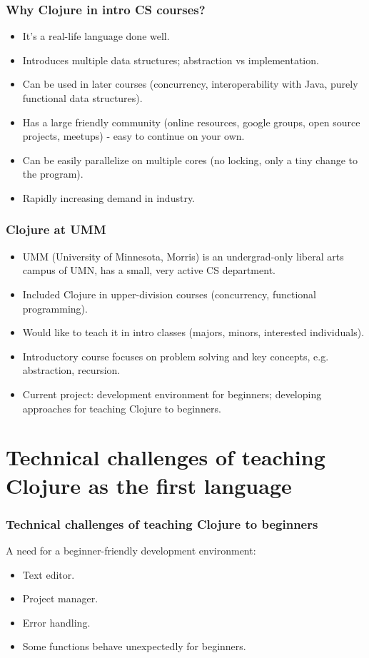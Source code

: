 \documentclass{beamer}
\begin{document}
\begin{frame}
\frametitle{Why Clojure in intro CS courses?}
\begin{itemize}
\item It's a real-life language done well. 
\item Introduces multiple data structures; abstraction vs implementation. 
\item Can be used in later courses  (concurrency, interoperability with Java, purely functional data structures). 
\item Has a large friendly community (online resources, google groups, open source projects, meetups) - easy to continue on your own. 
\item Can be easily parallelize on multiple cores (no locking, only a tiny change to the program). 
\item Rapidly increasing demand in industry. 
\end{itemize}
\end{frame}


\begin{frame}
\frametitle{Clojure at UMM}
\begin{itemize}
\item UMM (University of Minnesota, Morris) is an undergrad-only liberal arts campus of UMN, has a small, very active CS department. 
\item Included Clojure in upper-division courses (concurrency, functional programming). 
\item Would like to teach it in intro classes (majors, minors, interested individuals).
\item Introductory course focuses on problem solving and key concepts, e.g. abstraction, recursion.
\item Current project: development environment for beginners; developing approaches for teaching Clojure to beginners. 
\end{itemize}
\end{frame}

\section{Technical challenges of teaching Clojure as the first language}

\begin{frame}
\frametitle{Technical challenges of teaching Clojure to beginners}
A need for a beginner-friendly development environment:
\begin{itemize}
\item Text editor.
\item Project manager.
\item Error handling.
\item Some functions behave unexpectedly for beginners. 
\end{itemize}
\end{frame}
\end{document}
